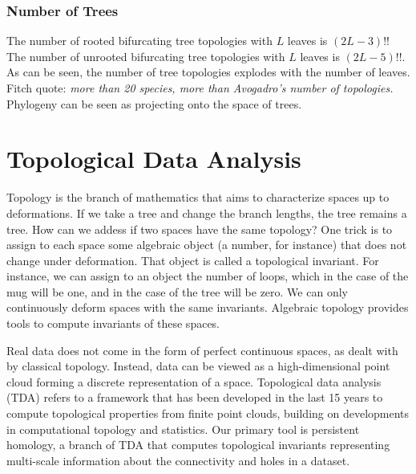 \subsubsection{Number of Trees}

The number of rooted bifurcating tree topologies with $L$ leaves is $(2L-3)!!$
The number of unrooted bifurcating tree topologies with $L$ leaves is $(2L-5)!!$.
As can be seen, the number of tree topologies explodes with the number of leaves.
Fitch quote: \emph{more than 20 species, more than Avogadro's number of topologies.}
Phylogeny can be seen as projecting onto the space of trees.



\section{Topological Data Analysis}

Topology is the branch of mathematics that aims to characterize spaces up to deformations.
If we take a tree and change the branch lengths, the tree remains a tree.
How can we addess if two spaces have the same topology?
One trick is to assign to each space some algebraic object (a number, for instance) that does not change under deformation.
That object is called a topological invariant.
For instance, we can assign to an object the number of loops, which in the case of the mug will be one, and in the case of the tree will be zero.
We can only continuously deform spaces with the same invariants.
Algebraic topology provides tools to compute invariants of these spaces.

Real data does not come in the form of perfect continuous spaces, as dealt with by classical topology.
Instead, data can be viewed as a high-dimensional point cloud forming a discrete representation of a space.
Topological data analysis (TDA) refers to a framework that has been developed in the last 15 years to compute topological properties from finite point clouds, building on developments in computational topology and statistics.
Our primary tool is persistent homology, a branch of TDA that computes topological invariants representing multi-scale information about the connectivity and holes in a dataset.

